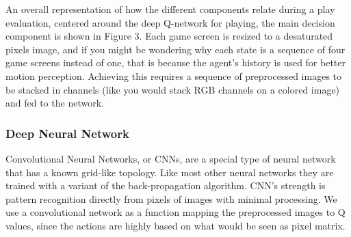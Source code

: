 \documentclass[a4paper]{article}
\begin{document}
An overall representation of how the different components relate during a play evaluation, centered around the deep Q-network for playing, the main decision component is shown in Figure 3. Each game screen is resized to a desaturated pixels image, and if you might be wondering why each state is a sequence of four game screens instead of one, that is because the agent's history is used for better motion perception. Achieving this requires a sequence of preprocessed images to be stacked in channels (like you would stack RGB channels on a colored image) and fed to the network.

\subsubsection{Deep Neural Network}

Convolutional Neural Networks, or CNNs, are a special type of neural network that has a known grid-like topology. Like most other neural networks they are trained with a variant of the back-propagation algorithm. CNN's strength is pattern recognition directly from pixels of images with minimal processing. We use a convolutional network as a function mapping the preprocessed images to Q values, since the actions are highly based on what would be seen as pixel matrix.
\end{document}
